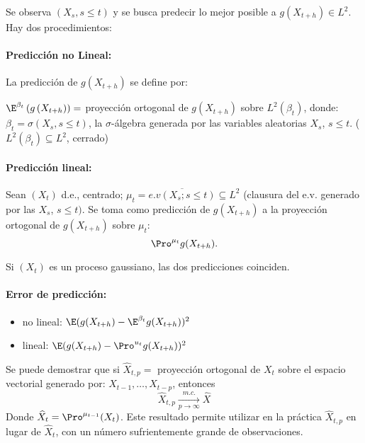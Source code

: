 Se observa $\left( {X_{s}, s\leq t} \right)$ y se busca predecir lo mejor posible a $g\left( {X_{t+h} } \right)\in L^{2}$. Hay dos procedimientos:

\paragraph{Predicci\'{o}n no Lineal:}
La predicci\'{o}n de $g\left( {X_{t+h} } \right)$ se define por:\newline

$\E^{\beta_{t} }\left( {g\left( {X_{t+h} } \right)} \right)=$ 
proyecci\'{o}n ortogonal de $g\left( {X_{t+h} } \right)$ sobre $L^{2}\left( 
{\beta_{t} } \right)$, donde: $\beta_{t} =\sigma (X_{s} ,s\leq t)$, la 
$\sigma$-\'{a}lgebra generada por las variables aleatorias $X_{s} $, $s\leq 
t.$ ($L^{2}\left( {\beta_{t} } \right)\subseteq L^{2}$, cerrado)

\paragraph{Predicci\'{o}n lineal:}\newline

Sean $(X_{t} )$ d.e., centrado; $\mu_{t} =\overline {e.v(X_{s} ;s\leq t)} \subseteq L^{2}$ (clausura del e.v. generado por las $X_{s}$, $s\leq t)$. Se toma como predicci\'{o}n de $g(X_{t+h})$ a la proyecci\'{o}n ortogonal de $g(X_{t+h} )$ sobre $\mu_{t}$:
\[
\Pro^{\mu_{t} } g(X_{t+h} ).
\]

\begin{observacion}
 Si $(X_{t})$ es un proceso gaussiano, las dos predicciones coinciden.
\end{observacion}

\paragraph{Error de predicci\'{o}n:}
\begin{itemize}
\item no lineal: $\E(g(X_{t+h} )-\E^{\beta_{t} }g(X_{t+h} ))^{2}$
\item lineal: $\E(g(X_{t+h} )-\Pro^{u_{t} } g(X_{t+h} ))^{2}$
\end{itemize}

\begin{observacion}
Se puede demostrar que si $\widehat{X}_{t,p} =$ proyecci\'{o}n ortogonal de $X_{t} $ sobre el espacio vectorial generado por: $X_{t-1} ,\ldots,X_{t-p} $, entonces 
\[
 \widehat{X}_{t,p}\xrightarrow[p\to \infty]{m.c.} \widehat{X}
\]
Donde $\widehat{X}_{t} =\Pro^{\mu_{t-1} }(X_{t} )$. Este resultado permite utilizar en la pr\'{a}ctica $\widehat{X}_{t,p}$ en lugar de $\widehat{X}_{t}$, con un n\'{u}mero sufrientemente grande de observaciones.
\end{observacion}

